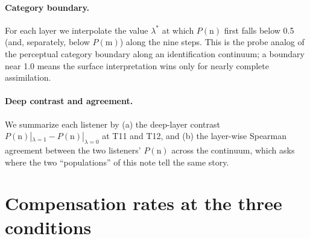 \documentclass[11pt,a4paper]{article}
\newcommand{\lam}{\lambda}
\begin{document}
\paragraph{Category boundary.} For each layer we interpolate the value
$\lam^{*}$ at which $P(\mathrm{n})$ first falls below 0.5 (and,
separately, below $P(\mathrm{m})$) along the nine steps. This is the
probe analog of the perceptual category boundary along an
identification continuum; a boundary near 1.0 means the surface
interpretation wins only for nearly complete assimilation.

\paragraph{Deep contrast and agreement.} We summarize each listener by
(a) the deep-layer contrast $P(\mathrm{n})|_{\lam=1} -
P(\mathrm{n})|_{\lam=0}$ at T11 and T12, and (b) the layer-wise
Spearman agreement between the two listeners' $P(\mathrm{n})$ across
the continuum, which asks where the two ``populations'' of this note
tell the same story.

\section{Compensation rates at the three conditions}
\label{sec:rates}
\end{document}
